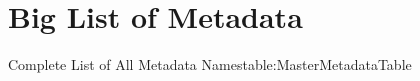 \section{Big List of Metadata}\label{sec:BLOM}

\begin{attributetable}{Complete List of All Metadata Names}{table:MasterMetadataTable}
\mNum
\mMin
\mMax
\mPrecision
\mAccuracy
\mUpdateRate
\mSampleRate
\mTimeWindow
\mTSLatency
\mTSAccuracy
\mMaxLen
\mNameLen
\mName
\mDescLen
\mDesc
\mValueLen
\mVendorInfoLen
\mVendorInfo
\mMeasureMethod
\mLiquidResCap
\mLiquidType
\mLiquidMaxPumpFlow
\mLiquidMinPumpFlow
\mLiquidRecommendedPumpFlow
\mLiquidMaxTemp
\mLiquidMinTemp
\mLiquidMaxPressure
\end{attributetable}

